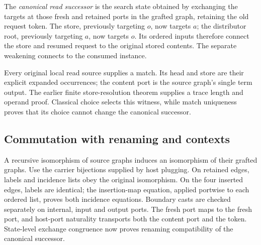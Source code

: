 





The \emph{canonical read successor} is the search state obtained by exchanging
the targets at those fresh and retained ports in the grafted graph, retaining
the old request token. The store, previously targeting $o$, now targets $a$;
the distributor root, previously targeting $a$, now targets $o$. Its ordered
inputs therefore connect the store and resumed request to the original stored
contents. The separate weakening connects to the consumed instance.


Every original local read source supplies a match. Its head and store are
their explicit expanded occurrences; the content port is the source graph's
single term output. The earlier finite store-resolution theorem supplies a
trace length and operand proof. Classical choice selects this witness, while
match uniqueness proves that its choice cannot change the canonical successor.


\subsection{Commutation with renaming and contexts}

A recursive isomorphism of source graphs induces an isomorphism of their
grafted graphs. Use the carrier bijections supplied by host plugging. On
retained edges, labels and incidence lists obey the original isomorphism.
On the four inserted edges, labels are identical; the insertion-map equation,
applied portwise to each ordered list, proves both incidence equations.
Boundary casts are checked separately on internal, input and output ports.
The fresh port maps to the fresh port, and host-port naturality transports
both the content port and the token. State-level exchange congruence now
proves renaming compatibility of the canonical successor.

